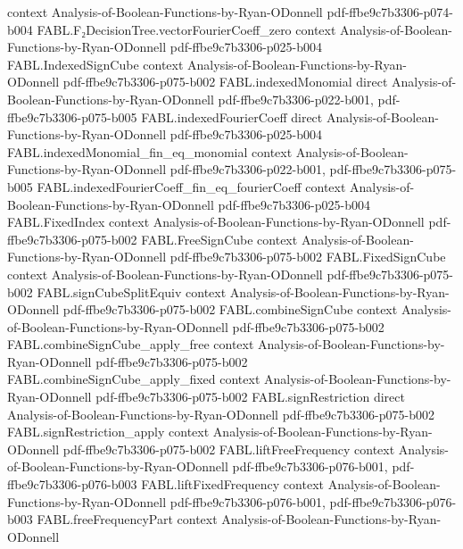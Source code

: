 \begin{theorem}
  {context}
  {Analysis-of-Boolean-Functions-by-Ryan-ODonnell}
  {pdf-ffbe9c7b3306-p074-b004}
\proofstep
  {FABL.F₂DecisionTree.vectorFourierCoeff_zero}
  {context}
  {Analysis-of-Boolean-Functions-by-Ryan-ODonnell}
  {pdf-ffbe9c7b3306-p025-b004}
\proofstep
  {FABL.IndexedSignCube}
  {context}
  {Analysis-of-Boolean-Functions-by-Ryan-ODonnell}
  {pdf-ffbe9c7b3306-p075-b002}
\proofstep
  {FABL.indexedMonomial}
  {direct}
  {Analysis-of-Boolean-Functions-by-Ryan-ODonnell}
  {pdf-ffbe9c7b3306-p022-b001,
    pdf-ffbe9c7b3306-p075-b005}
\proofstep
  {FABL.indexedFourierCoeff}
  {direct}
  {Analysis-of-Boolean-Functions-by-Ryan-ODonnell}
  {pdf-ffbe9c7b3306-p025-b004}
\proofstep
  {FABL.indexedMonomial_fin_eq_monomial}
  {context}
  {Analysis-of-Boolean-Functions-by-Ryan-ODonnell}
  {pdf-ffbe9c7b3306-p022-b001,
    pdf-ffbe9c7b3306-p075-b005}
\proofstep
  {FABL.indexedFourierCoeff_fin_eq_fourierCoeff}
  {context}
  {Analysis-of-Boolean-Functions-by-Ryan-ODonnell}
  {pdf-ffbe9c7b3306-p025-b004}
\proofstep
  {FABL.FixedIndex}
  {context}
  {Analysis-of-Boolean-Functions-by-Ryan-ODonnell}
  {pdf-ffbe9c7b3306-p075-b002}
\proofstep
  {FABL.FreeSignCube}
  {context}
  {Analysis-of-Boolean-Functions-by-Ryan-ODonnell}
  {pdf-ffbe9c7b3306-p075-b002}
\proofstep
  {FABL.FixedSignCube}
  {context}
  {Analysis-of-Boolean-Functions-by-Ryan-ODonnell}
  {pdf-ffbe9c7b3306-p075-b002}
\proofstep
  {FABL.signCubeSplitEquiv}
  {context}
  {Analysis-of-Boolean-Functions-by-Ryan-ODonnell}
  {pdf-ffbe9c7b3306-p075-b002}
\proofstep
  {FABL.combineSignCube}
  {context}
  {Analysis-of-Boolean-Functions-by-Ryan-ODonnell}
  {pdf-ffbe9c7b3306-p075-b002}
\proofstep
  {FABL.combineSignCube_apply_free}
  {context}
  {Analysis-of-Boolean-Functions-by-Ryan-ODonnell}
  {pdf-ffbe9c7b3306-p075-b002}
\proofstep
  {FABL.combineSignCube_apply_fixed}
  {context}
  {Analysis-of-Boolean-Functions-by-Ryan-ODonnell}
  {pdf-ffbe9c7b3306-p075-b002}
\proofstep
  {FABL.signRestriction}
  {direct}
  {Analysis-of-Boolean-Functions-by-Ryan-ODonnell}
  {pdf-ffbe9c7b3306-p075-b002}
\proofstep
  {FABL.signRestriction_apply}
  {context}
  {Analysis-of-Boolean-Functions-by-Ryan-ODonnell}
  {pdf-ffbe9c7b3306-p075-b002}
\proofstep
  {FABL.liftFreeFrequency}
  {context}
  {Analysis-of-Boolean-Functions-by-Ryan-ODonnell}
  {pdf-ffbe9c7b3306-p076-b001,
    pdf-ffbe9c7b3306-p076-b003}
\proofstep
  {FABL.liftFixedFrequency}
  {context}
  {Analysis-of-Boolean-Functions-by-Ryan-ODonnell}
  {pdf-ffbe9c7b3306-p076-b001,
    pdf-ffbe9c7b3306-p076-b003}
\proofstep
  {FABL.freeFrequencyPart}
  {context}
  {Analysis-of-Boolean-Functions-by-Ryan-ODonnell}

\end{theorem}
